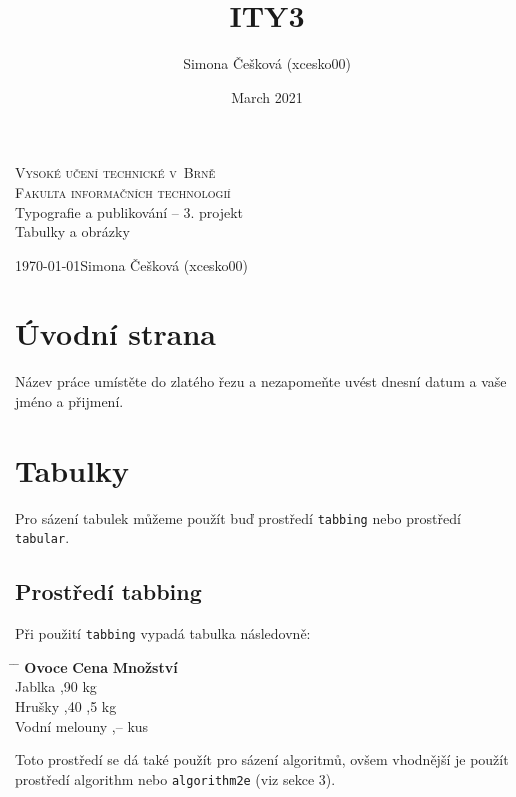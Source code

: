 \documentclass[a4paper, 11pt]{article}
\title{ITY3}
\author{Simona Češková (xcesko00)}
\date{March 2021}
\begin{document}
\begin{titlepage}
\begin{center}
\Huge
\textsc{Vysoké učení technické v~Brně\\
\huge{Fakulta informačních technologií}} \\
\LARGE
Typografie a publikování -- 3. projekt \\
\Huge{Tabulky a obrázky} \\
\end{center}
{\Large \today \hfill Simona Češková (xcesko00)}
\end{titlepage}


\section{Úvodní strana}
Název práce umístěte do zlatého řezu a nezapomeňte uvést dnesní datum a vaše jméno a přijmení.

\section{Tabulky}
Pro sázení tabulek můžeme použít buď prostředí \verb!tabbing! nebo prostředí \verb!tabular!.

\subsection{Prostředí tabbing}
Při použití \verb!tabbing! vypadá tabulka následovně:


 \begin{tabbing}
\hspace{1,1in}     \= \hspace{0.45in}  \= \hspace{0.40in}    \kill
\textbf{Ovoce} \> \textbf{Cena} \> \textbf{Množství}    \\ 
Jablka    ,90    kg      \\
Hrušky    ,40   ,5 kg    \\
Vodní melouny   ,–  kus  \\

\end{tabbing}

\noindent Toto prostředí se dá také použít pro sázení algoritmů, ovšem vhodnější je použít 
prostředí algorithm nebo \verb!algorithm2e! (viz sekce 3).
\end{document}
